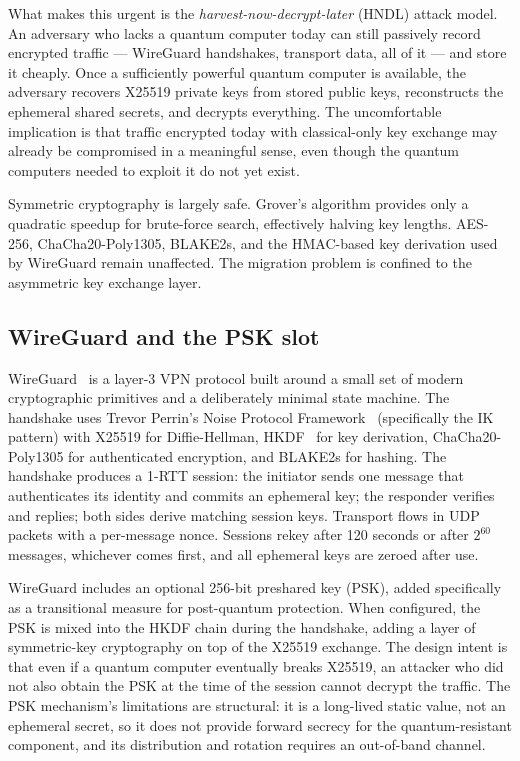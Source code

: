\documentclass[11pt,a4paper]{article}
\begin{document}
What makes this urgent is the \emph{harvest-now-decrypt-later} (HNDL) attack model. An adversary who lacks a quantum computer today can still passively record encrypted traffic --- WireGuard handshakes, transport data, all of it --- and store it cheaply. Once a sufficiently powerful quantum computer is available, the adversary recovers X25519 private keys from stored public keys, reconstructs the ephemeral shared secrets, and decrypts everything. The uncomfortable implication is that traffic encrypted today with classical-only key exchange may already be compromised in a meaningful sense, even though the quantum computers needed to exploit it do not yet exist.

Symmetric cryptography is largely safe. Grover's algorithm provides only a quadratic speedup for brute-force search, effectively halving key lengths. AES-256, ChaCha20-Poly1305, BLAKE2s, and the HMAC-based key derivation used by WireGuard remain unaffected. The migration problem is confined to the asymmetric key exchange layer.

\subsection{WireGuard and the PSK slot}

WireGuard~\cite{donenfeld2017wireguard} is a layer-3 VPN protocol built around a small set of modern cryptographic primitives and a deliberately minimal state machine. The handshake uses Trevor Perrin's Noise Protocol Framework~\cite{noise-protocol} (specifically the IK pattern) with X25519 for Diffie-Hellman, HKDF~\cite{rfc5869} for key derivation, ChaCha20-Poly1305 for authenticated encryption, and BLAKE2s for hashing. The handshake produces a 1-RTT session: the initiator sends one message that authenticates its identity and commits an ephemeral key; the responder verifies and replies; both sides derive matching session keys. Transport flows in UDP packets with a per-message nonce. Sessions rekey after 120 seconds or after $2^{60}$ messages, whichever comes first, and all ephemeral keys are zeroed after use.

WireGuard includes an optional 256-bit preshared key (PSK), added specifically as a transitional measure for post-quantum protection. When configured, the PSK is mixed into the HKDF chain during the handshake, adding a layer of symmetric-key cryptography on top of the X25519 exchange. The design intent is that even if a quantum computer eventually breaks X25519, an attacker who did not also obtain the PSK at the time of the session cannot decrypt the traffic. The PSK mechanism's limitations are structural: it is a long-lived static value, not an ephemeral secret, so it does not provide forward secrecy for the quantum-resistant component, and its distribution and rotation requires an out-of-band channel.
\end{document}
